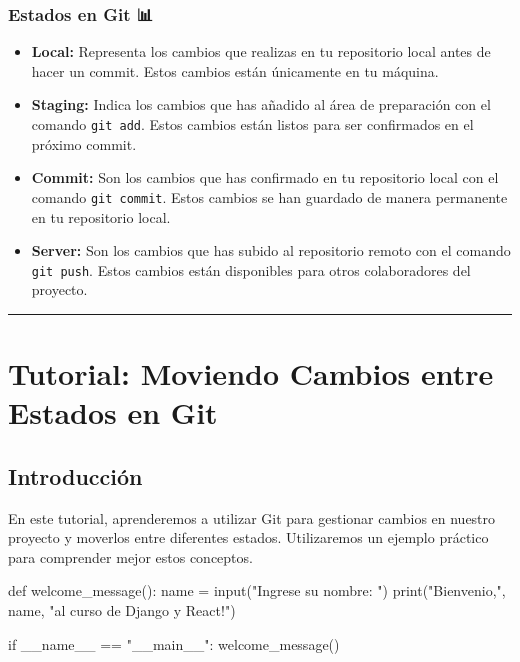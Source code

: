 \documentclass[
  a4paper,
  DIV=11,
  numbers=noendperiod,
  onepage,
  openany]{scrreprt}
\newenvironment{Shaded}{\begin{snugshade}}{\end{snugshade}}
\newcommand{\BuiltInTok}[1]{\textcolor[rgb]{0.00,0.23,0.31}{#1}}
\newcommand{\ControlFlowTok}[1]{\textcolor[rgb]{0.00,0.23,0.31}{#1}}
\newcommand{\KeywordTok}[1]{\textcolor[rgb]{0.00,0.23,0.31}{#1}}
\newcommand{\NormalTok}[1]{\textcolor[rgb]{0.00,0.23,0.31}{#1}}
\newcommand{\OperatorTok}[1]{\textcolor[rgb]{0.37,0.37,0.37}{#1}}
\newcommand{\StringTok}[1]{\textcolor[rgb]{0.13,0.47,0.30}{#1}}
\newcommand{\VariableTok}[1]{\textcolor[rgb]{0.07,0.07,0.07}{#1}}
\providecommand{\tightlist}{%
  \setlength{\itemsep}{0pt}\setlength{\parskip}{0pt}}\usepackage{longtable,booktabs,array}
\begin{document}
\subsection{Estados en Git 📊}\label{estados-en-git}

\begin{itemize}
\tightlist
\item
  \textbf{Local:} Representa los cambios que realizas en tu repositorio
  local antes de hacer un commit. Estos cambios están únicamente en tu
  máquina.
\item
  \textbf{Staging:} Indica los cambios que has añadido al área de
  preparación con el comando \texttt{git\ add}. Estos cambios están
  listos para ser confirmados en el próximo commit.
\item
  \textbf{Commit:} Son los cambios que has confirmado en tu repositorio
  local con el comando \texttt{git\ commit}. Estos cambios se han
  guardado de manera permanente en tu repositorio local.
\item
  \textbf{Server:} Son los cambios que has subido al repositorio remoto
  con el comando \texttt{git\ push}. Estos cambios están disponibles
  para otros colaboradores del proyecto.
\end{itemize}

\begin{center}\rule{0.5\linewidth}{0.5pt}\end{center}

\chapter{Tutorial: Moviendo Cambios entre Estados en Git
📝}\label{tutorial-moviendo-cambios-entre-estados-en-git}

\section{Introducción}\label{introducciuxf3n}

En este tutorial, aprenderemos a utilizar Git para gestionar cambios en
nuestro proyecto y moverlos entre diferentes estados. Utilizaremos un
ejemplo práctico para comprender mejor estos conceptos.

\begin{Shaded}
\begin{Highlighting}[]
\KeywordTok{def}\NormalTok{ welcome\_message():}
\NormalTok{    name }\OperatorTok{=} \BuiltInTok{input}\NormalTok{(}\StringTok{"Ingrese su nombre: "}\NormalTok{)}
    \BuiltInTok{print}\NormalTok{(}\StringTok{"Bienvenio,"}\NormalTok{, name, }\StringTok{"al curso de Django y React!"}\NormalTok{)}

\ControlFlowTok{if} \VariableTok{\_\_name\_\_} \OperatorTok{==} \StringTok{"\_\_main\_\_"}\NormalTok{:}
\NormalTok{    welcome\_message()}
\end{Highlighting}
\end{Shaded}
\end{document}
